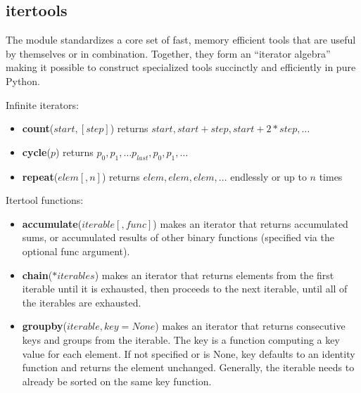 \subsection{itertools}
The module standardizes a core set of fast, memory efficient tools that are useful by themselves or in combination. Together, they form an “iterator algebra” making it possible to construct specialized tools succinctly and efficiently in pure Python.

Infinite iterators:
\begin{itemize}
\item \textbf{count}($start,[step]$) returns $start, start+step, start+2*step, …$
\item \textbf{cycle}($p$) returns $p_0, p_1, … p_{last}, p_0, p_1, …$
\item \textbf{repeat}($elem [, n]$) returns $elem, elem, elem, …$ endlessly or up to $n$ times
\end{itemize}
Itertool functions:
\begin{itemize}
\item \textbf{accumulate}($iterable[, func]$) makes an iterator that returns accumulated sums, or accumulated results of other binary functions (specified via the optional func argument). 
\item \textbf{chain}($*iterables$) makes an iterator that returns elements from the first iterable until it is exhausted, then proceeds to the next iterable, until all of the iterables are exhausted.
\item \textbf{groupby}($iterable, key=None$) makes an iterator that returns consecutive keys and groups from the iterable. The key is a function computing a key value for each element. If not specified or is None, key defaults to an identity function and returns the element unchanged. Generally, the iterable needs to already be sorted on the same key function.

\end{itemize}
